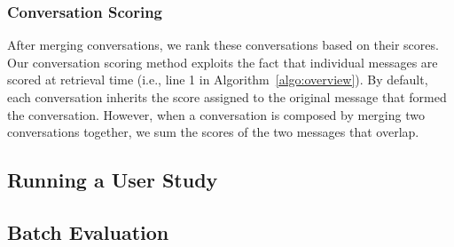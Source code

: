 \subsubsection{Conversation Scoring}
\label{sec:conv-scoring}

After merging conversations, we rank these conversations based on their scores. Our conversation scoring method exploits the fact that individual messages are scored at retrieval time (i.e., line 1 in Algorithm~\ref{algo:overview}). By default, each conversation inherits the score assigned to the original message that formed the conversation. However, when a conversation is composed by merging two conversations together, we sum the scores of the two messages that overlap.



\subsection{Running a User Study}


\subsection{Batch Evaluation}


%




